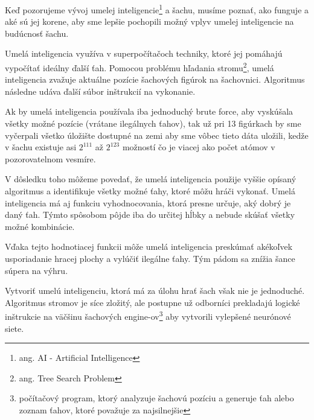 \documentclass[10pt,oneside,slovak,a4paper]{article}
\begin{document}
Keď pozorujeme vývoj umelej inteligencie\footnote{ang. AI - Artificial Intelligence} a šachu, musíme poznať, ako funguje a aké sú jej korene, aby sme lepšie pochopili možný vplyv umelej inteligencie na budúcnosť šachu.

Umelá inteligencia využíva v superpočítačoch techniky, ktoré jej pomáhajú vypočítať ideálny ďalší ťah. Pomocou problému hľadania stromu\footnote{ang. Tree Search Problem}, umelá inteligencia zvažuje aktuálne pozície šachových figúrok na šachovnici. Algoritmus následne udáva ďalší súbor inštrukcií na vykonanie.

Ak by umelá inteligencia používala iba jednoduchý brute force, aby vyskúšala všetky možné pozície (vrátane ilegálnych ťahov), tak už pri 13 figúrkach by sme vyčerpali všetko úložište dostupné na zemi aby sme vôbec tieto dáta uložili, kedže v šachu existuje asi $2^{111}$ až $2^{123}$ možností čo je viacej ako počet atómov v pozorovatelnom vesmíre.

V dôsledku toho môžeme povedať, že umelá inteligencia použije vyššie opísaný algoritmus a identifikuje všetky možné ťahy, ktoré môžu hráči vykonať. Umelá inteligencia má aj funkciu vyhodnocovania, ktorá presne určuje, aký dobrý je daný ťah. Týmto spôsobom pôjde iba do určitej hĺbky a nebude skúšať všetky možné kombinácie.

Vďaka tejto hodnotiacej funkcii môže umelá inteligencia preskúmať akékoľvek usporiadanie hracej plochy a vylúčiť ilegálne ťahy. Tým pádom sa znížia šance súpera na výhru.

Vytvoriť umelú inteligenciu, ktorá má za úlohu hrať šach však nie je jednoduché. Algoritmus stromov je síce zložitý, ale postupne už odborníci prekladajú logické inštrukcie na väčšinu šachových engine-ov\footnote{počítačový program, ktorý analyzuje šachovú pozíciu a generuje ťah alebo zoznam ťahov, ktoré považuje za najsilnejšie} aby vytvorili vylepšené neurónové siete.

\vspace*{\fill}
\end{document}
